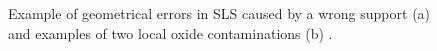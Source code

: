 \begin{figure}
    \centering
    \qquad
    \caption[Defects in PBF process.]{Example of geometrical errors in SLS caused by a wrong support (a) \cite{grasso_-process_2017} and examples of two local oxide contaminations (b) \cite{casati_microstructure_2016}.}
\end{figure} 
